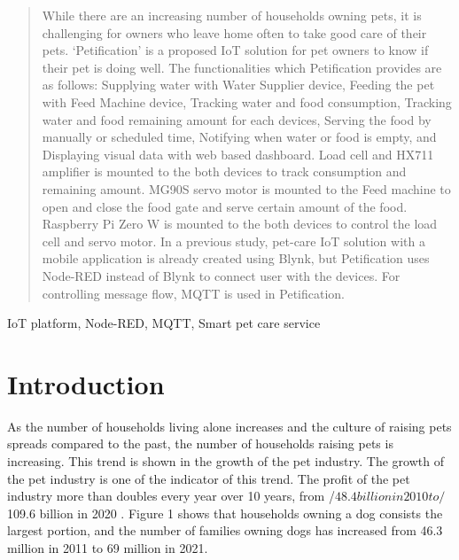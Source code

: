 \documentclass[conference]{IEEEtran}
\begin{document}
\begin{abstract}
While there are an increasing number of households owning pets, it is challenging for owners who leave home often to take good care of their pets.
‘Petification’ is a proposed IoT solution for pet owners to know if their pet is doing well. The functionalities which Petification provides are as follows: Supplying water with Water Supplier device, Feeding the pet with Feed Machine device, Tracking water and food consumption, Tracking water and food remaining amount for each devices, Serving the food by manually or scheduled time, Notifying when water or food is empty, and Displaying visual data with web based dashboard.
Load cell and HX711 amplifier is mounted to the both devices to track consumption and remaining amount. MG90S servo motor is mounted to the Feed machine to open and close the food gate and serve certain amount of the food. Raspberry Pi Zero W is mounted to the both devices to control the load cell and servo motor. In a previous study, pet-care IoT solution with a mobile application is already created using Blynk, but Petification uses Node-RED instead of Blynk to connect user with the devices. For controlling message flow, MQTT is used in Petification.

\end{abstract}
\begin{IEEEkeywords}
IoT platform, Node-RED, MQTT, Smart pet care service 
\end{IEEEkeywords}
\section{Introduction}
As the number of households living alone increases and the culture of raising pets spreads compared to the past, the number of households raising pets is increasing. This trend is shown in the growth of the pet industry. The growth of the pet industry is one of the indicator of this trend. The profit of the pet industry more than doubles every year over 10 years, from /$48.4 billion in 2010 to /$109.6 billion in 2020 \cite{b1}. Figure 1 shows that households owning a dog consists the largest portion, and the number of families owning dogs has increased from 46.3 million in 2011 to 69 million in 2021.
\end{document}
